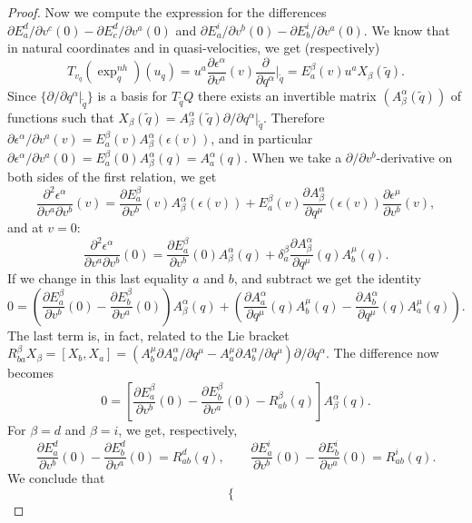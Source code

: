 \documentclass[10pt,a4paper]{amsart}
\begin{document}
\begin{proof}
Now we compute the expression for the differences $ {\partial E_a^d}/{\partial v^c}(0)-{\partial E_c^d}/{\partial v^a}(0) $ and ${\partial E_a^i}/{\partial v^b}(0)-{\partial E_b^i}/{\partial v^a}(0)$. 
We know that in natural coordinates and in quasi-velocities, we get (respectively) 
\[
    T_{v_q}(\exp^{nh}_q)(u_q) = u^a\frac{\partial \epsilon^\alpha}{\partial v^a}(v) \frac{\partial}{\partial q^\alpha}|_{\tilde{q}} = E_a^\beta(v) u^a X_\beta(\tilde{q}).
		\]
Since $\{{\partial}/{\partial q^\alpha}|_{\tilde q}\}$ is a basis for $T_{\tilde q} Q$ there  exists an invertible matrix  $(A_\beta^\alpha(\tilde{q}))$ of functions such that
$X_\beta(\tilde{q})=A_\beta^\alpha(\tilde{q}) {\partial}/{\partial q^\alpha}|_{\tilde{q}}$. Therefore 
$ {\partial \epsilon^\alpha}/{\partial v^a}(v)=E_a^\beta(v) A_\beta^\alpha(\epsilon(v))$, and  in particular ${\partial \epsilon^\alpha}/{\partial v^a}(0)=E_a^\beta(0) A_\beta^\alpha(q)=A_a^\alpha(q)$.
When we take a $\partial/\partial v^b$-derivative on both sides of the first relation, we get
\[
    \frac{\partial^2 \epsilon^\alpha}{\partial v^a\partial v^b}(v)=\frac{\partial E_a^\beta}{\partial v^b}(v) A_\beta^\alpha(\epsilon(v))+E_a^\beta(v) \frac{\partial A_\beta^\alpha}{\partial q^\mu}(\epsilon(v))\frac{\partial \epsilon^\mu}{\partial v^b}(v),
	\]
and at  $v=0$:
\[
\frac{\partial^2 \epsilon^\alpha}{\partial v^a\partial v^b}(0)=\frac{\partial E_a^\beta}{\partial v^b}(0) A_\beta^\alpha(q)+\delta_a^\beta \frac{\partial A_\beta^\alpha}{\partial q^\mu}(q)
A^\mu_b(q).
\]
If we change in this last equality  $a$ and $b$, and subtract we get the identity
$$
 0=\left(\frac{\partial E_a^\beta}{\partial v^b}(0)-\frac{\partial E_b^\beta}{\partial v^a}(0)\right) A_\beta^\alpha(q)+\left( \frac{\partial A_a^\alpha}{\partial q^\mu}(q)A^\mu_b(q)- \frac{\partial A_b^\alpha}{\partial q^\mu}(q)A^\mu_a(q) \right).
$$
The last term is, in fact, related to the Lie bracket
$ R^\beta_{ba} X_\beta= [X_b,X_a]=(A^\mu_b{\partial A_a^\alpha}/{\partial q^\mu}- A^\mu_a{\partial A_b^\alpha}/{\partial q^\mu}) {\partial}/{\partial q^\alpha}$. 
The difference now becomes
$$ 
0=\left[\frac{\partial E_a^\beta}{\partial v^b}(0)-\frac{\partial E_b^\beta}{\partial v^a}(0) -R_{ab}^\beta(q)\right]A^\alpha_{\beta}(q).
$$
For $\beta=d$ and $\beta=i$, we get, respectively,
 $$
\frac{\partial E_a^d}{\partial v^b}(0)-\frac{\partial E_b^d}{\partial v^a}(0)=R_{ab}^d(q) ,
\qquad \frac{\partial E_a^i}{\partial v^b}(0)-\frac{\partial E_b^i}{\partial v^a}(0) =R_{ab}^i(q).
$$
We conclude that 
\begin{equation}
    \begin{cases}

\end{cases}
\end{equation}
\end{proof}
\end{document}

